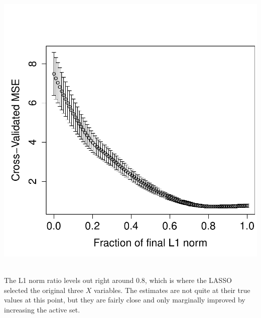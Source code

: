 \documentclass[a4paper]{article}
\begin{document}
\begin{minipage}[c]{0.6\linewidth}
\includegraphics{h4_ind-006}
\end{minipage}\\
The L1 norm ratio levels out right around $0.8$, which is where
the LASSO selected the original three $X$ variables.  The estimates
are not quite at their true values at this point, but they are fairly
close and only marginally improved by increasing the active set.\\
\end{document}
